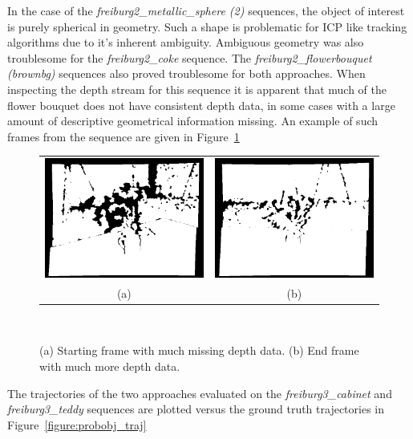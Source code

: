In the case of the \textit{freiburg2\_metallic\_sphere (2)} sequences, the object 
of interest is purely spherical in geometry. Such a shape is problematic for ICP like tracking 
algorithms due to it's inherent ambiguity. Ambiguous geometry was also troublesome for the 
\textit{freiburg2\_coke} sequence. The \textit{freiburg2\_flowerbouquet (brownbg)} sequences 
also proved troublesome for both approaches. When inspecting the depth stream for this sequence 
it is apparent that much of the flower bouquet does not have consistent depth data, in some cases 
with a large amount of descriptive geometrical information missing. An example of such frames 
from the sequence are given in Figure~\ref{figure:probobj_flower_depth}
\begin{figure}[!htbp]
	\centering
	\begin{tabular}{cc}
		\includegraphics[width=.45\linewidth]{figures/object_recon/flower_begin.png}&
    \includegraphics[width=.45\linewidth]{figures/object_recon/flower_end.png}\\
    (a) & (b) 
	\end{tabular}
  \caption[Probabilistic Object Reconstruction Qualitative Results V]
  {
    (a) Starting frame with much missing depth data. 
    (b) End frame with much more depth data.
  }
~\label{figure:probobj_flower_depth}
\end{figure}

The trajectories of the two approaches evaluated on the \textit{freiburg3\_cabinet} 
and \textit{\textsf{freiburg3\_teddy}} sequences are plotted versus the ground truth trajectories 
in Figure~\ref{figure:probobj_traj}

